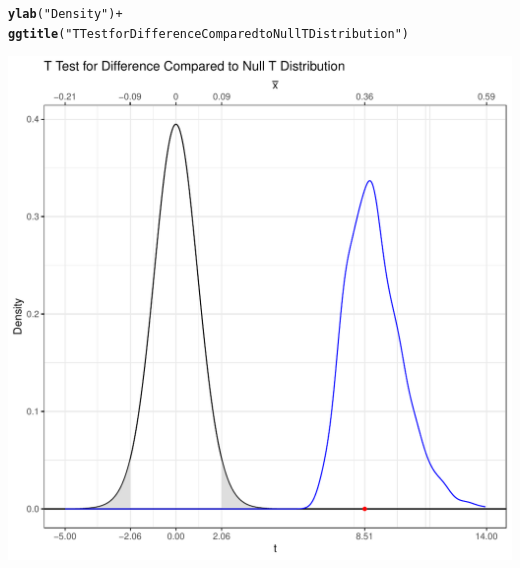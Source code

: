 \documentclass{article}\usepackage[]{graphicx}\usepackage[]{xcolor}
\makeatletter
\def\maxwidth{ %
  \ifdim\Gin@nat@width>\linewidth
    \linewidth
  \else
    \Gin@nat@width
  \fi
}
\newcommand{\hlsng}[1]{\textcolor[rgb]{0.192,0.494,0.8}{#1}}%
\newcommand{\hlopt}[1]{\textcolor[rgb]{0,0,0}{#1}}%
\newcommand{\hldef}[1]{\textcolor[rgb]{0.345,0.345,0.345}{#1}}%
\newcommand{\hlkwd}[1]{\textcolor[rgb]{0.737,0.353,0.396}{\textbf{#1}}}%
\newenvironment{kframe}{%
 \def\at@end@of@kframe{}%
 \ifinner\ifhmode%
  \def\at@end@of@kframe{\end{minipage}}%
  \begin{minipage}{\columnwidth}%
 \fi\fi%
 \def\FrameCommand##1{\hskip\@totalleftmargin \hskip-\fboxsep
 \colorbox{shadecolor}{##1}\hskip-\fboxsep
     \hskip-\linewidth \hskip-\@totalleftmargin \hskip\columnwidth}%
 \MakeFramed {\advance\hsize-\width
   \@totalleftmargin\z@ \linewidth\hsize
   \@setminipage}}%
 {\par\unskip\endMakeFramed%
 \at@end@of@kframe}
\newenvironment{knitrout}{}{} %
\makeatother
\begin{document}
\begin{enumerate}
\begin{enumerate}
\begin{knitrout}
\begin{kframe}
\begin{alltt}
  \hlkwd{ylab}\hldef{(}\hlsng{"Density"}\hldef{)}\hlopt{+}
  \hlkwd{ggtitle}\hldef{(}\hlsng{"T Test for Difference Compared to Null T Distribution"}\hldef{)}
\end{alltt}
\end{kframe}
\includegraphics[width=\maxwidth]{figure/unnamed-chunk-12-1} 
\end{knitrout}

\end{enumerate}
\end{enumerate}



\end{document}
